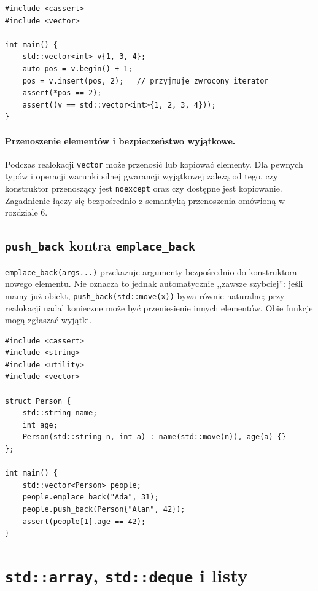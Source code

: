 \begin{lstlisting}[caption={Bezpieczne ponowne pobranie iteratora po wstawieniu; kompletny program.}]
#include <cassert>
#include <vector>

int main() {
    std::vector<int> v{1, 3, 4};
    auto pos = v.begin() + 1;
    pos = v.insert(pos, 2);   // przyjmuje zwrocony iterator
    assert(*pos == 2);
    assert((v == std::vector<int>{1, 2, 3, 4}));
}
\end{lstlisting}

\paragraph{Przenoszenie elementów i bezpieczeństwo wyjątkowe.}
Podczas realokacji \texttt{vector} może przenosić lub kopiować elementy.
Dla pewnych typów i operacji warunki silnej gwarancji wyjątkowej zależą
od tego, czy konstruktor przenoszący jest \texttt{noexcept} oraz czy
dostępne jest kopiowanie. Zagadnienie łączy się bezpośrednio z semantyką
przenoszenia omówioną w rozdziale 6.

\subsection{\texttt{push\_back} kontra \texttt{emplace\_back}}

\texttt{emplace\_back(args...)} przekazuje argumenty bezpośrednio do
konstruktora nowego elementu. Nie oznacza to jednak automatycznie
,,zawsze szybciej'': jeśli mamy już obiekt, \texttt{push\_back(std::move(x))}
bywa równie naturalne; przy realokacji nadal konieczne może być
przeniesienie innych elementów. Obie funkcje mogą zgłaszać wyjątki.

\begin{lstlisting}[caption={Konstruowanie elementu z argumentow (C++17); kompletny program.}]
#include <cassert>
#include <string>
#include <utility>
#include <vector>

struct Person {
    std::string name;
    int age;
    Person(std::string n, int a) : name(std::move(n)), age(a) {}
};

int main() {
    std::vector<Person> people;
    people.emplace_back("Ada", 31);
    people.push_back(Person{"Alan", 42});
    assert(people[1].age == 42);
}
\end{lstlisting}

\section{\texttt{std::array}, \texttt{std::deque} i listy}
\label{sec:cpp13-sequential}

